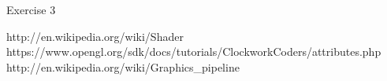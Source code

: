 Exercise 3

http://en.wikipedia.org/wiki/Shader
https://www.opengl.org/sdk/docs/tutorials/ClockworkCoders/attributes.php
http://en.wikipedia.org/wiki/Graphics_pipeline

